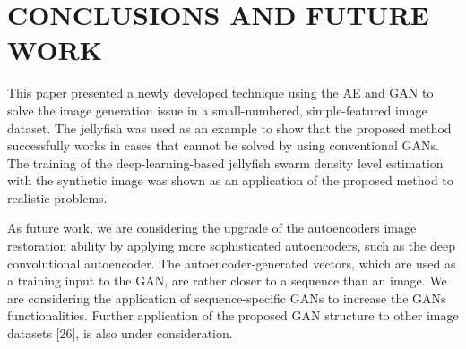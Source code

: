 \documentclass{ieeeaccess}
\begin{document}
\section{CONCLUSIONS AND FUTURE WORK}
This paper presented a newly developed technique using the AE and GAN to solve the image generation issue in a small-numbered, simple-featured image dataset. The jellyfish was used as an example to show that the proposed method successfully works in cases that cannot be solved by using conventional GANs. The training of the deep-learning-based jellyfish swarm density level estimation with the synthetic image was shown as an application of the proposed method to realistic problems. 

As future work, we are considering the upgrade of the autoencoder\textquotesingle s image restoration ability by applying more sophisticated autoencoders, such as the deep convolutional autoencoder. The autoencoder-generated vectors, which are used as a training input to the GAN, are rather closer to a sequence than an image. We are considering the application of sequence-specific GANs to increase the GAN\textquotesingle s functionalities. Further application of the proposed GAN structure to other image datasets [26], is also under consideration.
\end{document}
